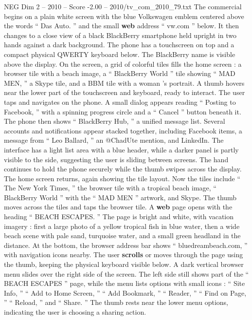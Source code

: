 \begin{textsample}{NEG Dim 2 – 2010 – Score -2.00 – 2010/tv\_com\_2010\_79.txt}  \label{ex:f2_neg_041}
The commercial begins on a plain white screen with the blue Volkswagen emblem centered above the words “ Das Auto. ” and the small \textbf{web} address “ vw.com ” below.
It then changes to a close view of a black BlackBerry smartphone held upright in two hands against a dark background.
The phone has a touchscreen on top and a compact physical QWERTY keyboard below.
The BlackBerry name is visible above the display.
On the screen, a grid of colorful tiles fills the home screen : a browser tile with a beach image, a “ BlackBerry World ” tile showing “ MAD MEN, ” a Skype tile, and a BBM tile with a woman ’s portrait.
A thumb hovers near the lower part of the touchscreen and keyboard, ready to interact.
The user taps and navigates on the phone.
A small dialog appears reading “ Posting to Facebook, ” with a spinning progress circle and a “ Cancel ” button beneath it.
The phone then shows “ BlackBerry Hub, ” a unified message list.
Several accounts and notifications appear stacked together, including Facebook items, a message from “ Leo Ballard, ” an @ChadUte mention, and LinkedIn.
The interface has a light list area with a blue header, while a darker panel is partly visible to the side, suggesting the user is sliding between screens.
The hand continues to hold the phone securely while the thumb swipes across the display.
The home screen returns, again showing the tile layout.
Now the tiles include “ The New York Times, ” the browser tile with a tropical beach image, “ BlackBerry World ” with the “ MAD MEN ” artwork, and Skype.
The thumb moves across the tiles and taps the browser tile.
A \textbf{web} page opens with the heading “ BEACH ESCAPES. ” The page is bright and white, with vacation imagery : first a large photo of a yellow tropical fish in blue water, then a wide beach scene with pale sand, turquoise water, and a small green headland in the distance.
At the bottom, the browser address bar shows “ bluedreambeach.com, ” with navigation icons nearby.
The user \textbf{scrolls} or moves through the page using the thumb, keeping the physical keyboard visible below.
A dark vertical browser menu slides over the right side of the screen.
The left side still shows part of the “ BEACH ESCAPES ” page, while the menu lists options with small icons : “ Site Info, ” “ Add to Home Screen, ” “ Add Bookmark, ” “ Reader, ” “ Find on Page, ” “ Reload, ” and “ Share. ” The thumb rests near the lower menu options, indicating the user is choosing a sharing action.

\end{textsample}
